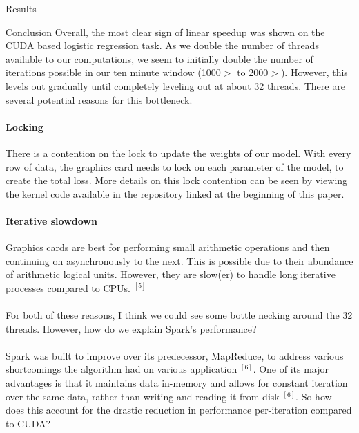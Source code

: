 \documentclass[11pt]{article}
\begin{document}
\begin{section}{Results}
\end{section}

\begin{section}{Conclusion}
	Overall, the most clear sign of linear speedup was shown on the CUDA based logistic regression task. As we double the number of threads available to our computations, we seem to initially double the number of iterations possible in our ten minute window (1000$>$ to 2000$>$). However, this levels out  gradually until completely leveling out at about 32 threads. There are several potential reasons for this bottleneck.
	\paragraph{Locking} There is a contention on the lock to update the weights of our model. With every row of data, the graphics card needs to lock on each parameter of the model, to create the total loss. More details on this lock contention can be seen by viewing the kernel code available in the repository linked at the beginning of this paper.
	\paragraph{Iterative slowdown} Graphics cards are best for performing small arithmetic operations and then continuing on asynchronously to the next. This is possible due to their abundance of arithmetic logical units. However, they are slow(er) to handle long iterative processes compared to CPUs. $^{[5]}$
	\\
	\\
	For both of these reasons, I think we could see some bottle necking around the 32 threads. However, how do we explain Spark's performance?
	\\
	\\
	Spark was built to improve over its predecessor, MapReduce, to address various shortcomings the algorithm had on various application $^{[6]}$. One of its major advantages is that it maintains data in-memory and allows for constant iteration over the same data, rather than writing and reading it from disk $^{[6]}$. So how does this account for the drastic reduction in performance per-iteration compared to CUDA?
	

\end{section}
\end{document}
